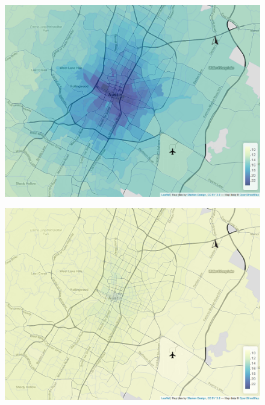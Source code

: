 \documentclass[11pt]{article}
\begin{document}
\begin{figure}[htb]
    \centering
    \begin{minipage}[t]{0.48\linewidth}
        \centering
        \includegraphics[width=\linewidth]{img/quantile_9_1.png}
        \label{fig:quantiles:0.1:a}
    \end{minipage}
    \begin{minipage}[t]{0.48\linewidth}
        \centering
        \includegraphics[width=\linewidth]{img/quantile_43_1.png}
        \label{fig:quantiles:0.1:b}
    \end{minipage}\hfill
    \begin{minipage}[t]{.48\linewidth}

\end{minipage}
\end{figure}
\end{document}
